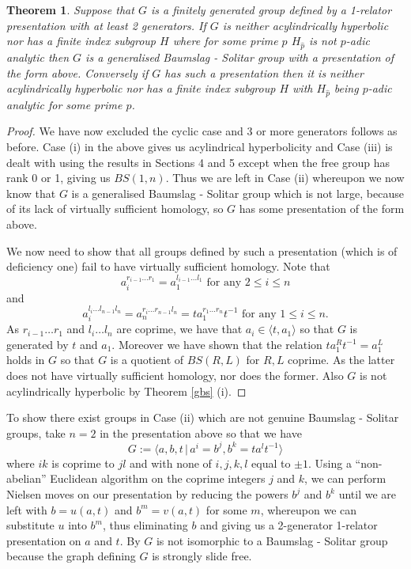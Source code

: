 \documentclass[11pt,reqno]{amsart}
\numberwithin{equation}{section}
\newcommand{\leqs}{\leqslant}
\newtheorem{thm}{Theorem}[section]
\theoremstyle{definition}
\theoremstyle{remark}
\begin{document}
\begin{thm} \label{last} Suppose that
  $G$ is a finitely generated group defined by a
  1-relator presentation with at least 2 generators. If $G$ is neither
  acylindrically hyperbolic 
  nor has a finite index subgroup $H$ where for some prime $p$
  $H_{\hat{p}}$ is not $p$-adic analytic then $G$ is a generalised
  Baumslag - Solitar group with a presentation of the form above.
  Conversely if $G$ has such a presentation then it is neither
  acylindrically hyperbolic nor has a finite index subgroup
  $H$ with $H_{\hat{p}}$ being $p$-adic analytic for some prime $p$.
  \end{thm}
\begin{proof}
  We have now excluded the cyclic case and 3 or more generators follows
  as before. Case (i) in the above gives us acylindrical hyperbolicity
  and Case (iii) is dealt with using the results in Sections 4 and 5
  except when the free group has rank 0 or 1, giving us $BS(1,n)$. Thus
  we are left in Case (ii) whereupon we now know that $G$ is
  a generalised Baumslag - Solitar group which is not large, because of
  its lack of virtually sufficient homology, so $G$ has some presentation
  of the form above.

  We now need to show that all groups defined by such a presentation
(which is of deficiency one)
  fail to have virtually sufficient homology. Note that
  \[a_i^{r_{i-1}\ldots r_1}=a_1^{l_{i-1}\ldots l_1}\mbox{ for any }
    2\leqs i\leqs n\] and
  \[ a_i^{l_i\ldots l_{n-1}l_n}=a_n^{r_i \ldots r_{n-1}l_n}=ta_1^{r_1\ldots r_n}t^{-1}
      \mbox{ for any } 1\leqs i\leqs n.\]
    As $r_{i-1}\ldots r_1$ and $l_i\ldots l_n$ are coprime, we have that
    $a_i\in\langle t,a_1\rangle$ so that $G$ is generated by $t$ and $a_1$.
    Moreover we have shown that the relation $ta_1^Rt^{-1}=a_1^L$ holds
    in $G$ so that $G$ is a quotient of $BS(R,L)$ for $R,L$ coprime. As the
    latter does not have virtually sufficient homology, nor does the
    former. Also $G$ is not acylindrically hyperbolic by
    Theorem \ref{gbs} (i).
\end{proof}
To show there exist groups in Case (ii) which are not genuine
Baumslag - Solitar groups, take $n=2$ in the presentation above so that
we have
\[G:=\langle a,b,t\,|\,
  a^i=b^j, b^k
  =ta^lt^{-1}\rangle\]
where $ik$ is coprime to $jl$ and with none of $i,j,k,l$ equal to $\pm 1$.
Using a ``non-abelian'' Euclidean
algorithm on the coprime integers $j$ and $k$, we can perform Nielsen
moves on our presentation by reducing the powers
$b^j$ and $b^k$ until we are left with $b=u(a,t)$ and $b^m=v(a,t)$ for
some $m$, whereupon we can substitute $u$ into $b^m$, thus
eliminating $b$ and giving us a 2-generator 1-relator presentation
on $a$ and $t$.
By \cite{frdfrm} $G$ is not isomorphic to a Baumslag - Solitar group because
the graph defining $G$ is strongly slide free.
\end{document}
